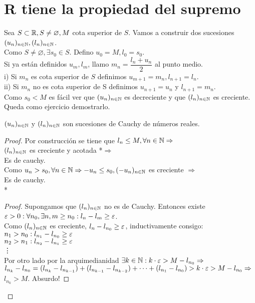 \section{R tiene la propiedad del supremo}

Sea \(S \subset \mathbb{R}, S \neq \varnothing, M\) cota superior de \(S\). Vamos a construir dos sucesiones \((u_n)_{n \in \mathbb{N}}, (l_n)_{n \in \mathbb{N}}\). \\
Como \(S \neq \varnothing, \exists s_0 \in S\). Defino \(u_0 = M, l_0 = s_0\). \\
Si ya están definidos \(u_m, l_m\), llamo \(m_n = \dfrac{l_n+u_n}{2}\) al punto medio. \\
i) Si \(m_n\) es cota superior de \(S\) definimos \(u_{m+1} = m_n, l_{n+1} = l_n\). \\
ii) Si \(m_n\) no es cota superior de S definimos \(u_{n+1} = u_n\) y \(l_{n+1} = m_n\). \\
Como \(s_0 < M\) es fácil ver que \((u_n)_{n \in \mathbb{N}}\) es decreciente y que \((l_n)_{n \in \mathbb{N}}\) es creciente. Queda como ejercicio demostrarlo.

\begin{lemma}
  \((u_n)_{n \in \mathbb{N}}\) y \((l_n)_{n \in \mathbb{N}}\) son sucesiones de Cauchy de números reales.
  \begin{proof}
    Por construcción se tiene que \(l_n \leq M, \forall n \in \mathbb{N} \Rightarrow\) \\
    \((l_n)_{n \in \mathbb{N}}\) es creciente y acotada *\(\Rightarrow\) \\
    Es de cauchy. \\

    Como \(u_n > s_0, \forall n \in \mathbb{N} \Rightarrow -u_n \leq s_0, (-u_n)_{n \in \mathbb{N}}\) es creciente \(\Rightarrow\) \\
    Es de cauchy. \\

    * \begin{proof}
      Supongamos que \((l_n)_{n \in \mathbb{N}}\) no es de Cauchy. Entonces existe \(\varepsilon > 0 : \forall n_0, \exists n, m \geq n_0 : l_n - l_m \geq \varepsilon\). \\
      Como \((l_n)_{n \in \mathbb{N}}\) es creciente, \(l_n - l_{n_0} \geq \varepsilon\), inductivamente consigo: \\
      \(n_1 > n_0 : l_{n_1} - l_{n_0} \geq \varepsilon\) \\
      \(n_2 > n_1 : l_{n_2} - l_{n_1} \geq \varepsilon\) \\
      \vdots \\

      Por otro lado por la arquimedianidad \(\exists k \in \mathbb{N} : k \cdot \varepsilon > M - l_{n_0} \Rightarrow\) \\
      \(l_{n_k} - l_{n_0} = (l_{n_k} - l_{n_{k-1}}) + (l_{n_{k-1}} - l_{n_{k-2}}) + \cdots + (l_{n_1} - l_{n_0}) > k \cdot \varepsilon > M - l_{n_0} \Rightarrow\) \\
      \(l_{n_k} > M\). Absurdo!
    \end{proof}
  \end{proof}
\end{lemma}


